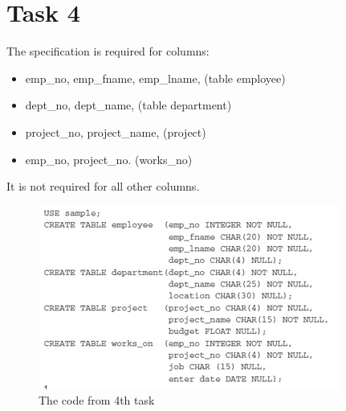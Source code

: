 \documentclass[english]{article}
\begin{document}
\section{Task 4}
The specification is required for columns: 
\begin{itemize}
 \item emp\_no, emp\_fname, emp\_lname, (table employee)
 \item dept\_no, dept\_name, (table department)
 \item project\_no, project\_name, (project)
 \item emp\_no, project\_no. (works\_no)
\end{itemize}
It is not required for all other columns.

\begin{figure}[hb]
\centerline{\includegraphics{SQLCreateDB/task4}}
\caption{The code from 4th task}
\end{figure}
\end{document}
